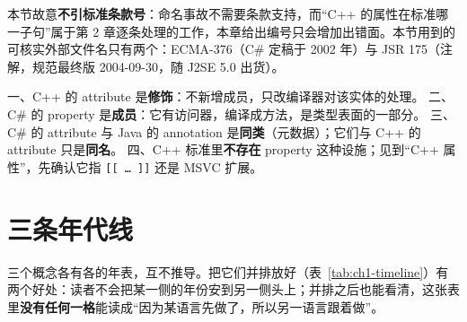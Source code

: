 \documentclass[12pt,a4paper,fontset=fandol]{ctexbook}
\newcommand{\cpp}[1]{C++#1}
\begin{document}
\begin{stdbox}[title={本节的依据边界}]
本节故意\textbf{不引标准条款号}：命名事故不需要条款支持，而“\cpp{} 的属性在标准哪一子句”属于第 2 章逐条处理的工作，本章给出编号只会增加出错面。本节用到的可核实外部文件名只有两个：ECMA-376（C\# 定稿于 2002 年）与 JSR 175（注解，规范最终版 2004-09-30，随 J2SE 5.0 出货）。
\end{stdbox}

\begin{guideline}[title={本节要记住的四句}]
一、\cpp{} 的 attribute 是\textbf{修饰}：不新增成员，只改编译器对该实体的处理。
二、C\# 的 property 是\textbf{成员}：它有访问器，编译成方法，是类型表面的一部分。
三、C\# 的 attribute 与 Java 的 annotation 是\textbf{同类}（元数据）；它们与 \cpp{} 的 attribute 只是\textbf{同名}。
四、\cpp{} 标准里\textbf{不存在} property 这种设施；见到“\cpp{} 属性”，先确认它指 \texttt{[[\,\dots\,]]} 还是 MSVC 扩展。
\end{guideline}

\section{三条年代线}
\label{sec:one-timeline}

三个概念各有各的年表，互不推导。把它们并排放好（表~\ref{tab:ch1-timeline}）有两个好处：读者不会把某一侧的年份安到另一侧头上；并排之后也能看清，这张表里\textbf{没有任何一格}能读成“因为某语言先做了，所以另一语言跟着做”。
\end{document}
